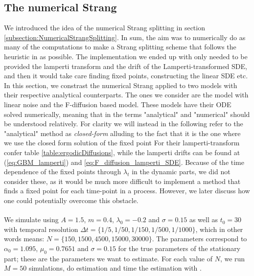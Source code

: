 \subsection{The numerical Strang}
We introduced the idea of the numerical Strang splitting in section \ref{subsection:NumericalStrangSplitting}. In sum, the aim was to numerically do as many of the computations to make a Strang splitting scheme that follows the heuristic in \cite{SplittingSchemes} as possible. The implementation we ended up with only needed to be provided the lamperti transform and the drift of the Lamperti-transformed SDE, and then it would take care finding fixed points, constructing the linear SDE etc. In this section, we constrast the numerical Strang applied to two models with their respective analytical counterparts. The ones we consider are the model with linear noise and the F-diffusion based model. 
These models have their ODE solved numerically, meaning that in the terms "analytical" and "numerical" should be understood relatively. For clarity we will instead in the following refer to the "analytical" method as \textit{closed-form} alluding to the fact that it is the one where we use the closed form solution of the fixed point For their lamperti-transform confer table \ref{table:ergodicDiffusions}, while the lamperti drifts can be found at (\ref{eq:GBM_lamperti}) and \ref{eq:F_diffusion_lamperti_SDE}. Because of the time dependence of the fixed points through $\lambda_t$ in the dynamic parts, we did not consider these, as it would be much more difficult to implement a method that finds a fixed point for each time-point in a process. However, we later discuss how one could potentially overcome this obstacle.\\\\
We simulate using $A = 1.5$, $m=0.4$, $\lambda_0 = -0.2$ and $\sigma =0.15$ as well as $t_0 = 30$ with temporal resolution $\Delta t = \{1/5, 1/50, 1/150, 1/500, 1/1000\}$, which in other words means: $N =  \{150, 1500, 4500, 15000, 30000\}$.  The parameters correspond to $\alpha_0 = 1.095$, $\mu_0 = 0.7651$ and $\sigma = 0.15$ for the true parameters of the stationary part; these are the parameters we want to estimate. For each value of $N$, we run $M = 50$ simulations, do estimation and time the estimation with .

